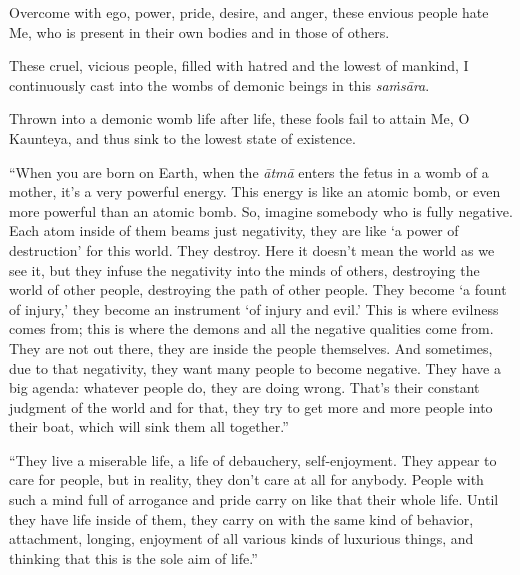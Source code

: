 {Overcome with ego, power, pride, desire, and anger, these envious people hate Me, who is present in their own bodies and in those of others.}

{These cruel, vicious people, filled with hatred and the lowest of mankind, I continuously cast into the wombs of demonic beings in this \textit{saṁsāra}.}

{Thrown into a demonic womb life after life, these fools fail to attain Me, O Kaunteya, and thus sink to the lowest state of existence.}

\enquote{When you are born on Earth, when the \textit{ātmā} enters the fetus in a womb of a mother, it’s a very powerful energy. This energy is like an atomic bomb, or even more powerful than an atomic bomb. So, imagine somebody who is fully negative. Each atom inside of them beams just negativity, they are like \enquote{a power of destruction} for this world. They destroy. Here it doesn’t mean the world as we see it, but they infuse the negativity into the minds of others, destroying the world of other people, destroying the path of other people. They become \enquote{a fount of injury,} they become an instrument \enquote{of injury and evil.} This is where evilness comes from; this is where the demons and all the negative qualities come from. They are not out there, they are inside the people themselves. And sometimes, due to that negativity, they want many people to become negative. They have a big agenda: whatever people do, they are doing wrong. That’s their constant judgment of the world and for that, they try to get more and more people into their boat, which will sink them all together.}

\enquote{They live a miserable life, a life of debauchery, self-enjoyment. They appear to care for people, but in reality, they don’t care at all for anybody. People with such a mind full of arrogance and pride carry on like that their whole life. Until they have life inside of them, they carry on with the same kind of behavior, attachment, longing, enjoyment of all various kinds of luxurious things, and thinking that this is the sole aim of life.}

